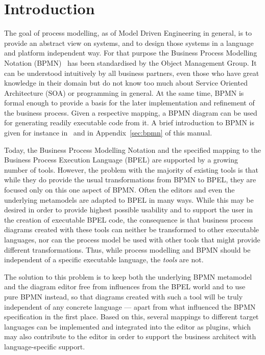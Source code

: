 \chapter{Introduction}
\label{sec:intro}

%
%

The goal of process modelling, as of Model Driven Engineering in general, is to provide an abstract view on systems, and to design those systems in a language and platform independent way.  For that purpose the Business Process Modelling Notation (BPMN)~\cite{omg2009bpmn} has been standardised by the Object Management Group.  It can be understood intuitively by all business partners, even those who have great knowledge in their domain but do not know too much about Service Oriented Architecture (SOA) or programming in general.  At the same time, BPMN is formal enough to provide a basis for the later implementation and refinement of the business process.  Given a respective mapping, a BPMN diagram can be used for generating readily executable code from it.  A brief introduction to BPMN is given for instance in~\cite{white2004introduction} and in Appendix~\ref{sec:bpmn} of this manual.

Today, the Business Process Modelling Notation and the specified mapping to the Business Process Execution Language (BPEL) are supported by a growing number of tools.  However, the problem with the majority of existing tools is that while they do provide the usual transformations from BPMN to BPEL, they are focused only on this one aspect of BPMN.  Often the editors and even the underlying metamodels are adapted to BPEL in many ways.  While this may be desired in order to provide highest possible usability and to support the user in the creation of executable BPEL code, the consequence is that business process diagrams created with these tools can neither be transformed to other executable languages, nor can the process model be used with other tools that might provide different transformations.  Thus, while process modelling and BPMN should be independent of a specific executable language, the \emph{tools} are not.

The solution to this problem is to keep both the underlying BPMN metamodel and the diagram editor free from influences from the BPEL world and to use pure BPMN instead, so that diagrams created with such a tool will be truly independent of any concrete language --- apart from what influenced the BPMN specification in the first place.  Based on this, several mappings to different target languages can be implemented and integrated into the editor as plugins, which may also contribute to the editor in order to support the business architect with language-specific support.

